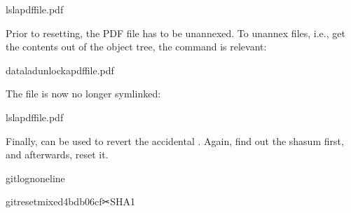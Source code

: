 \begin{sphinxVerbatim}[commandchars=\\\{\}]
ls\PYGZhy{}lapdffile.pdf
\end{sphinxVerbatim}

\sphinxAtStartPar
Prior to resetting, the PDF file has to be unannexed.
To unannex files, i.e., get the contents out of the object tree,
the  command is relevant:

\begin{sphinxVerbatim}[commandchars=\\\{\}]
dataladunlockapdffile.pdf
\end{sphinxVerbatim}

\sphinxAtStartPar
The file is now no longer symlinked:

\begin{sphinxVerbatim}[commandchars=\\\{\}]
ls\PYGZhy{}lapdffile.pdf
\end{sphinxVerbatim}

\sphinxAtStartPar
Finally,  can be used to revert the
accidental . Again, find out the shasum first, and
afterwards, reset it.

\begin{sphinxVerbatim}[commandchars=\\\{\}]
gitlog\PYGZhy{}n\PYGZhy{}\PYGZhy{}oneline
\end{sphinxVerbatim}

\begin{sphinxVerbatim}[commandchars=\\\{\}]
gitreset\PYGZhy{}\PYGZhy{}mixed4bdb06cf✂SHA1
\end{sphinxVerbatim}

